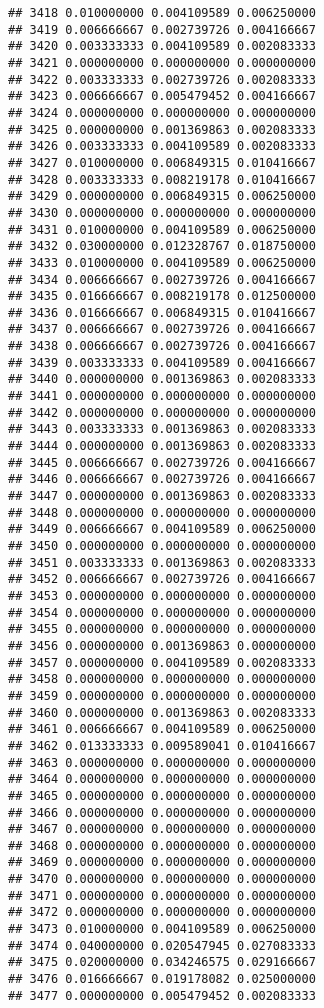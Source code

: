 \documentclass[
]{article}
\begin{document}
\begin{verbatim}
## 3418 0.010000000 0.004109589 0.006250000
## 3419 0.006666667 0.002739726 0.004166667
## 3420 0.003333333 0.004109589 0.002083333
## 3421 0.000000000 0.000000000 0.000000000
## 3422 0.003333333 0.002739726 0.002083333
## 3423 0.006666667 0.005479452 0.004166667
## 3424 0.000000000 0.000000000 0.000000000
## 3425 0.000000000 0.001369863 0.002083333
## 3426 0.003333333 0.004109589 0.002083333
## 3427 0.010000000 0.006849315 0.010416667
## 3428 0.003333333 0.008219178 0.010416667
## 3429 0.000000000 0.006849315 0.006250000
## 3430 0.000000000 0.000000000 0.000000000
## 3431 0.010000000 0.004109589 0.006250000
## 3432 0.030000000 0.012328767 0.018750000
## 3433 0.010000000 0.004109589 0.006250000
## 3434 0.006666667 0.002739726 0.004166667
## 3435 0.016666667 0.008219178 0.012500000
## 3436 0.016666667 0.006849315 0.010416667
## 3437 0.006666667 0.002739726 0.004166667
## 3438 0.006666667 0.002739726 0.004166667
## 3439 0.003333333 0.004109589 0.004166667
## 3440 0.000000000 0.001369863 0.002083333
## 3441 0.000000000 0.000000000 0.000000000
## 3442 0.000000000 0.000000000 0.000000000
## 3443 0.003333333 0.001369863 0.002083333
## 3444 0.000000000 0.001369863 0.002083333
## 3445 0.006666667 0.002739726 0.004166667
## 3446 0.006666667 0.002739726 0.004166667
## 3447 0.000000000 0.001369863 0.002083333
## 3448 0.000000000 0.000000000 0.000000000
## 3449 0.006666667 0.004109589 0.006250000
## 3450 0.000000000 0.000000000 0.000000000
## 3451 0.003333333 0.001369863 0.002083333
## 3452 0.006666667 0.002739726 0.004166667
## 3453 0.000000000 0.000000000 0.000000000
## 3454 0.000000000 0.000000000 0.000000000
## 3455 0.000000000 0.000000000 0.000000000
## 3456 0.000000000 0.001369863 0.000000000
## 3457 0.000000000 0.004109589 0.002083333
## 3458 0.000000000 0.000000000 0.000000000
## 3459 0.000000000 0.000000000 0.000000000
## 3460 0.000000000 0.001369863 0.002083333
## 3461 0.006666667 0.004109589 0.006250000
## 3462 0.013333333 0.009589041 0.010416667
## 3463 0.000000000 0.000000000 0.000000000
## 3464 0.000000000 0.000000000 0.000000000
## 3465 0.000000000 0.000000000 0.000000000
## 3466 0.000000000 0.000000000 0.000000000
## 3467 0.000000000 0.000000000 0.000000000
## 3468 0.000000000 0.000000000 0.000000000
## 3469 0.000000000 0.000000000 0.000000000
## 3470 0.000000000 0.000000000 0.000000000
## 3471 0.000000000 0.000000000 0.000000000
## 3472 0.000000000 0.000000000 0.000000000
## 3473 0.010000000 0.004109589 0.006250000
## 3474 0.040000000 0.020547945 0.027083333
## 3475 0.020000000 0.034246575 0.029166667
## 3476 0.016666667 0.019178082 0.025000000
## 3477 0.000000000 0.005479452 0.002083333

\end{verbatim}
\end{document}
